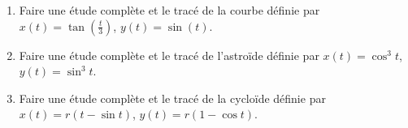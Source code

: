 \begin{frame}
\begin{miniexercice}
\begin{enumerate} 
  \item  Faire une étude complète et le tracé de la courbe définie par
  $x(t) = \tan \left(\frac t 3\right)$,  $y(t) = \sin (t)$. 
  
  \item Faire une étude complète et le tracé de 
  l'astroïde définie par $x(t) = \cos^3 t$,  $y(t) = \sin^3 t$. 
  
  
  \item Faire une étude complète et le tracé de 
  la cycloïde définie par   $x(t) = r(t-\sin t)$,  $y(t) = r(1-\cos t)$. 
\end{enumerate}
\end{miniexercice}
\end{frame}


